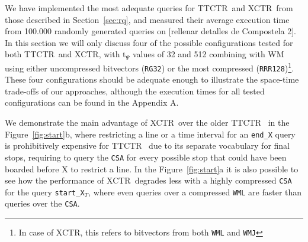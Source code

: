 \documentclass[runningheads]{llncs}
\newcommand{\ctr}{XCTR}
\newcommand{\ttctr}{TTCTR}
\begin{document}
We have implemented the most adequate queries for \ttctr~and \ctr~from those described in Section~\ref{sec:rq}, and measured their average execution time from 100.000 randomly generated queries on [rellenar detalles de Compostela 2]. In this section we will only discuss four of the possible configurations tested for both \ttctr~and \ctr, with t$_{\Psi}$ values of 32 and 512 combining with WM using either uncompressed bitvectors (\texttt{RG32}) or the most compressed (\texttt{RRR128})\footnote{In case of \ctr, this refers to bitvectors from both \texttt{WML} and \texttt{WMJ}}. These four configurations should be adequate enough to illustrate the space-time trade-offs of our approaches, although the execution times for all tested configurations can be found in the Appendix A.

We demonstrate the main advantage of \ctr~over the older \ttctr~ in the Figure~\ref{fig:start}b, where restricting a line or a time interval for an \texttt{end\_X} query is prohibitively expensive for \ttctr~ due to its separate vocabulary for final stops, requiring to query the \texttt{CSA} for every possible stop that could have been boarded before X to restrict a line. In the Figure~\ref{fig:start}a it is also possible to see how the performance of \ctr~degrades less with a highly compressed \texttt{CSA} for the query \texttt{start\_X$_T$}, where even queries over a compressed \texttt{WML} are faster than queries over the \texttt{CSA}.
\end{document}
